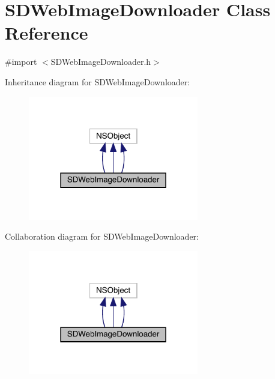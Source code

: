 \hypertarget{interface_s_d_web_image_downloader}{}\section{S\+D\+Web\+Image\+Downloader Class Reference}
\label{interface_s_d_web_image_downloader}


{\ttfamily \#import $<$S\+D\+Web\+Image\+Downloader.\+h$>$}



Inheritance diagram for S\+D\+Web\+Image\+Downloader\+:\nopagebreak
\begin{figure}[H]
\begin{center}
\leavevmode
\includegraphics[width=211pt]{interface_s_d_web_image_downloader__inherit__graph}
\end{center}
\end{figure}


Collaboration diagram for S\+D\+Web\+Image\+Downloader\+:\nopagebreak
\begin{figure}[H]
\begin{center}
\leavevmode
\includegraphics[width=211pt]{interface_s_d_web_image_downloader__coll__graph}
\end{center}
\end{figure}
